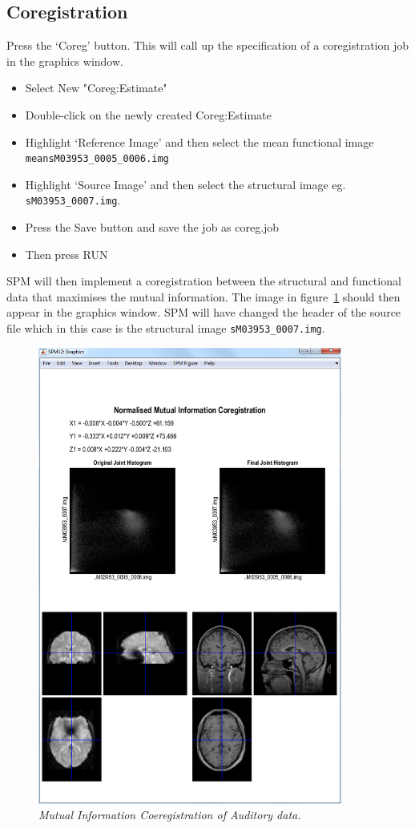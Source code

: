 \documentclass[a4paper,titlepage]{book}
\newcommand{\bi}{\begin{itemize}}
\newcommand{\ei}{\end{itemize}}
\begin{document}
\subsection{Coregistration}

Press the `Coreg' button. This will call up the specification of a coregistration job in the graphics 
window. 

\bi
\item{Select New "Coreg:Estimate"}
\item{Double-click on the newly created Coreg:Estimate}
\item{Highlight `Reference Image' and then select the
 mean functional image
\verb!meansM03953_0005_0006.img!}
\item{Highlight `Source Image' and then select 
the structural image eg. \verb!sM03953_0007.img!.}
\item{Press the Save button and save the job as 
{\sf coreg.job}}
\item{Then press RUN}
\ei
SPM will then implement a coregistration between the structural and functional data that maximises the mutual information. The image in figure~\ref{aud_coreg} should then appear 
in the graphics window. SPM will have changed the header 
of the source file which in this case is the 
structural image \verb!sM03953_0007.img!.
\begin{figure}
\begin{center}
\includegraphics[width=100mm]{coreg}
\caption{\em Mutual Information Coeregistration  of Auditory data. \label{aud_coreg}}
\end{center}
\end{figure}
\end{document}
